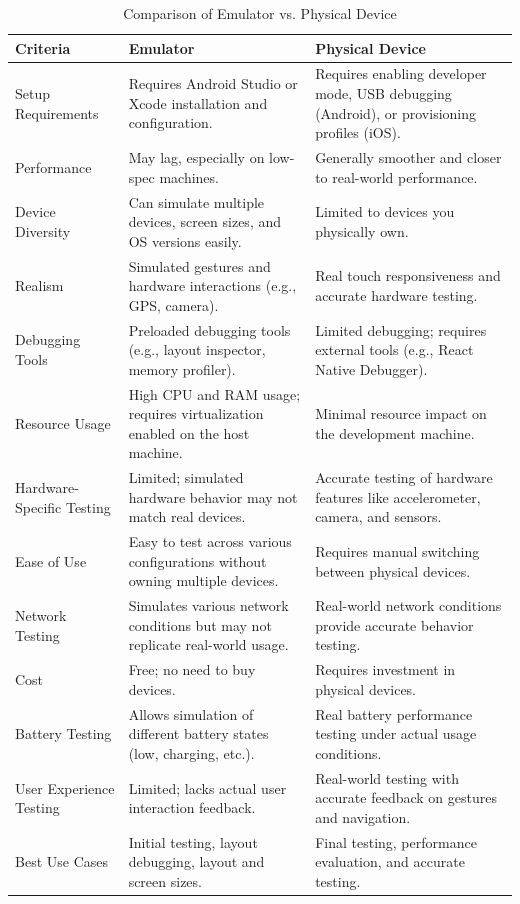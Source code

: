 \documentclass[12pt]{article}
\begin{document}
\begin{table}[H]  %
\centering
\renewcommand{\arraystretch}{1} %
\setlength{\tabcolsep}{10pt} %
\begin{tabular}{|p{4cm}|p{5cm}|p{5cm}|}
\hline
\textbf{Criteria} & \textbf{Emulator} & \textbf{Physical Device} \\ \hline
Setup Requirements & 
Requires Android Studio or Xcode installation and configuration. & 
Requires enabling developer mode, USB debugging (Android), or provisioning profiles (iOS). \\ \hline
Performance & 
May lag, especially on low-spec machines. & 
Generally smoother and closer to real-world performance. \\ \hline
Device Diversity & 
Can simulate multiple devices, screen sizes, and OS versions easily. & 
Limited to devices you physically own. \\ \hline
Realism & 
Simulated gestures and hardware interactions (e.g., GPS, camera). & 
Real touch responsiveness and accurate hardware testing. \\ \hline
Debugging Tools & 
Preloaded debugging tools (e.g., layout inspector, memory profiler). & 
Limited debugging; requires external tools (e.g., React Native Debugger). \\ \hline
Resource Usage & 
High CPU and RAM usage; requires virtualization enabled on the host machine. & 
Minimal resource impact on the development machine. \\ \hline
Hardware-Specific Testing & 
Limited; simulated hardware behavior may not match real devices. & 
Accurate testing of hardware features like accelerometer, camera, and sensors. \\ \hline
Ease of Use & 
Easy to test across various configurations without owning multiple devices. & 
Requires manual switching between physical devices. \\ \hline
Network Testing & 
Simulates various network conditions but may not replicate real-world usage. & 
Real-world network conditions provide accurate behavior testing. \\ \hline
Cost & 
Free; no need to buy devices. & 
Requires investment in physical devices. \\ \hline
Battery Testing & 
Allows simulation of different battery states (low, charging, etc.). & 
Real battery performance testing under actual usage conditions. \\ \hline
User Experience Testing & 
Limited; lacks actual user interaction feedback. & 
Real-world testing with accurate feedback on gestures and navigation. \\ \hline
Best Use Cases & 
Initial testing, layout debugging, layout and screen sizes. & 
Final testing, performance evaluation, and accurate testing. \\ \hline
\end{tabular}
\caption{Comparison of Emulator vs. Physical Device}
\label{tab:comparison}
\end{table}
\end{document}

